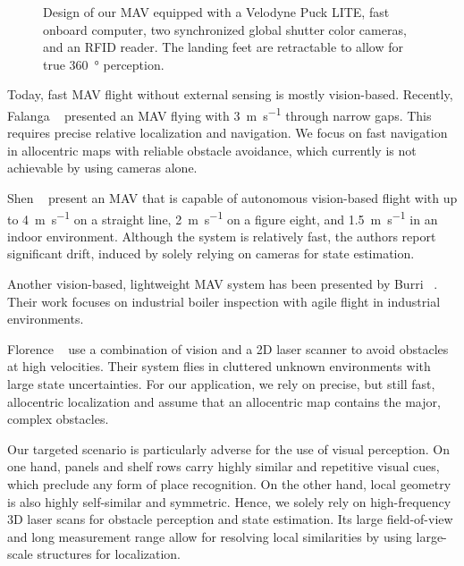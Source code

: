 \begin{figure}[t]
  \centering
  \resizebox{0.9\linewidth}{!}{
  
  }
  \vspace{-1.0em}
  \caption{Design of our MAV equipped with a Velodyne Puck LITE, fast onboard computer, two synchronized global shutter color cameras, and an RFID reader. The landing feet are retractable to allow for true \SI{360}{\degree} perception.}
  \label{fig:MAV}
  \vspace{-3ex}
\end{figure}

Today, fast MAV flight without external sensing is mostly vision-based.
Recently, Falanga \etal~\cite{falanga2017} presented an MAV flying with \SI{3}{\meter\per\second} through narrow gaps.
This requires precise relative localization and navigation. We focus on fast navigation in allocentric maps with reliable obstacle avoidance, which currently is not achievable by using cameras alone.

Shen \etal~\cite{Shen_RSS_2013} present an MAV that is capable of autonomous vision-based flight with up to \SI{4}{\meter\per\second} on a straight line, \SI{2}{\meter\per\second} on a figure eight, and \SI{1.5}{\meter\per\second} in an indoor environment. Although the system is relatively fast, the authors report significant drift, induced by solely relying on cameras for state estimation.

Another vision-based, lightweight MAV system has been presented by Burri \etal~\cite{burri2012}.
Their work focuses on industrial boiler inspection with agile flight in industrial environments.

Florence \etal~\cite{florence2016} use a combination of vision and a 2D laser scanner to avoid obstacles at high velocities. Their system flies in cluttered unknown environments with large state uncertainties.
For our application, we rely on precise, but still fast, allocentric localization and assume that an allocentric map contains the major, complex obstacles.

Our targeted scenario is particularly adverse for the use of visual perception. On one hand, panels and shelf rows carry highly similar and repetitive visual cues, which preclude any form of place recognition. On the other hand, local geometry is also highly self-similar and symmetric. Hence, we solely rely on high-frequency 3D laser scans for obstacle perception and state estimation. Its large field-of-view and long measurement range allow for resolving local similarities by using large-scale structures for localization.


